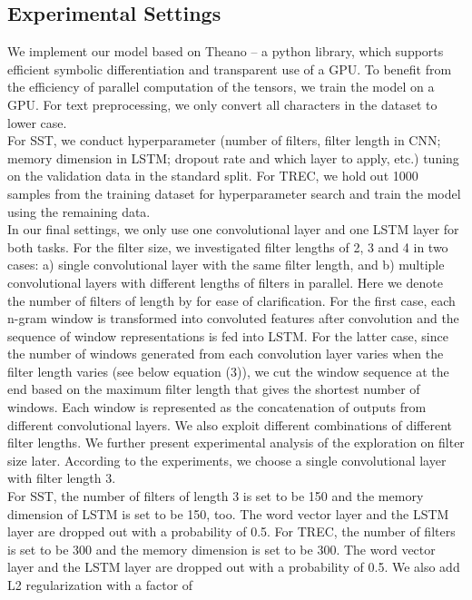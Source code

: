 \documentclass[11pt,letterpaper]{article}
\begin{document}
\subsection{Experimental Settings}
We implement our model based on Theano \cite{theano} -- a python library, which supports efficient symbolic differentiation and transparent use of a GPU. To benefit from the efficiency of parallel computation of the tensors, we train the model on
a GPU. For text preprocessing, we only convert all characters in the
dataset to lower case.\\
\indent For SST, we conduct hyperparameter (number of filters, filter
length in CNN; memory dimension in LSTM; dropout rate and which layer to
apply, etc.) tuning on the validation data in the standard split. For
TREC, we hold out 1000 samples from the training dataset for
hyperparameter search and train the model using the remaining data.\\
\indent In our final settings, we only use one convolutional layer and
one LSTM layer for both tasks. For the filter size, we investigated
filter lengths of 2, 3 and 4 in two cases: a) single convolutional layer
with the same filter length, and b) multiple convolutional layers with
different lengths of filters in parallel. Here we denote the number of
filters of length  by  for ease of clarification. For the first
case, each n-gram window is transformed into  convoluted features
after convolution and the sequence of window representations is fed into
LSTM. For the latter case, since the number of windows generated from
each convolution layer varies when the filter length varies (see 
below equation (3)), we cut the window sequence at the end based on the
maximum filter length that gives the shortest number of windows. Each
window is represented as the concatenation of outputs from different
convolutional layers. We also exploit different combinations of
different filter lengths. We further present experimental analysis of
the exploration on filter size later. According to the experiments, we
choose a single convolutional layer with filter length 3.\\
\indent For SST, the number of filters of length 3 is set to be 150 and
the memory dimension of LSTM is set to be 150, too. The word vector
layer and the LSTM layer are dropped out with a probability of 0.5. For
TREC, the number of filters is set to be 300 and the memory dimension is
set to be 300. The word vector layer and the LSTM layer are dropped out with
a probability of 0.5. We also add L2 regularization with a factor of
\end{document}
